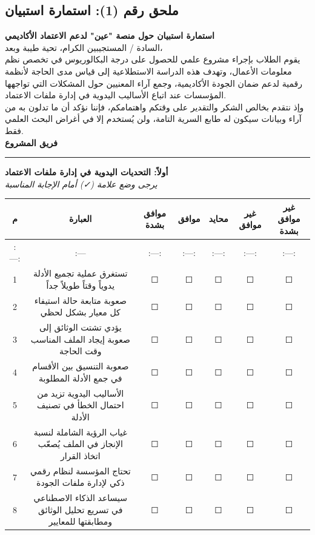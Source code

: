 \documentclass[12pt, a4paper]{report}
\begin{document}
\begin{english}
{\section*{ملحق رقم (1): استمارة استبيان}

\textbf{استمارة استبيان حول منصة "عين" لدعم الاعتماد الأكاديمي} \\

السادة / المستجيبين الكرام، تحية طيبة وبعد، \\

يقوم الطلاب بإجراء مشروع علمي للحصول على درجة البكالوريوس في تخصص نظم معلومات الأعمال، وتهدف هذه الدراسة الاستطلاعية إلى قياس مدى الحاجة لأنظمة رقمية لدعم ضمان الجودة الأكاديمية، وجمع آراء المعنيين حول المشكلات التي تواجهها المؤسسات عند اتباع الأساليب اليدوية في إدارة ملفات الاعتماد. \\

وإذ نتقدم بخالص الشكر والتقدير على وقتكم واهتمامكم، فإننا نؤكد أن ما تدلون به من آراء وبيانات سيكون له طابع السرية التامة، ولن يُستخدم إلا في أغراض البحث العلمي فقط. \\

\textbf{فريق المشروع} \\

\vspace{0.5cm}\hrule\vspace{0.5cm}

\textbf{أولاً: التحديات اليدوية في إدارة ملفات الاعتماد} \\

\textit{يرجى وضع علامة (✓) أمام الإجابة المناسبة} \\

\begin{longtable}{|c|c|c|c|c|c|c|}
\hline
م & العبارة & موافق بشدة & موافق & محايد & غير موافق & غير موافق بشدة \\ \hline
:---: & :--- & :---: & :---: & :---: & :---: & :---: \\ \hline
1 & تستغرق عملية تجميع الأدلة يدوياً وقتاً طويلاً جداً & ☐ & ☐ & ☐ & ☐ & ☐ \\ \hline
2 & صعوبة متابعة حالة استيفاء كل معيار بشكل لحظي & ☐ & ☐ & ☐ & ☐ & ☐ \\ \hline
3 & يؤدي تشتت الوثائق إلى صعوبة إيجاد الملف المناسب وقت الحاجة & ☐ & ☐ & ☐ & ☐ & ☐ \\ \hline
4 & صعوبة التنسيق بين الأقسام في جمع الأدلة المطلوبة & ☐ & ☐ & ☐ & ☐ & ☐ \\ \hline
5 & الأساليب اليدوية تزيد من احتمال الخطأ في تصنيف الأدلة & ☐ & ☐ & ☐ & ☐ & ☐ \\ \hline
6 & غياب الرؤية الشاملة لنسبة الإنجاز في الملف يُصعّب اتخاذ القرار & ☐ & ☐ & ☐ & ☐ & ☐ \\ \hline
7 & تحتاج المؤسسة لنظام رقمي ذكي لإدارة ملفات الجودة & ☐ & ☐ & ☐ & ☐ & ☐ \\ \hline
8 & سيساعد الذكاء الاصطناعي في تسريع تحليل الوثائق ومطابقتها للمعايير & ☐ & ☐ & ☐ & ☐ & ☐ \\ \hline
\end{longtable}

}
\end{english}
\end{document}
